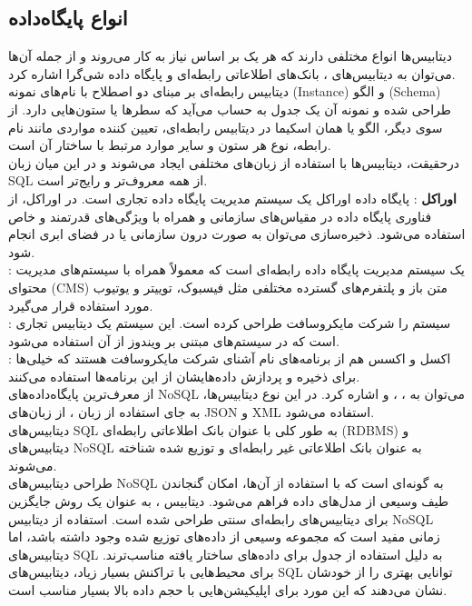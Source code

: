 \documentclass[]{article}
\begin{document}
\subsection*{{\titr انواع پایگاه‌داده}}
دیتابیس‌ها انواع مختلفی دارند که هر یک بر اساس نیاز به کار می‌روند و از جمله آن‌ها می‌توان به دیتابیس‌های ، بانک‌های اطلاعاتی رابطه‌ای و پایگاه داده شی‌گرا اشاره کرد.\\
دیتابیس رابطه‌ای بر مبنای دو اصطلاح با نام‌های نمونه (Instance) و الگو (Schema) طراحی شده و نمونه آن یک جدول به حساب می‌آید که سطرها یا ستون‌هایی دارد. از سوی دیگر، الگو یا همان اسکیما در دیتابیس رابطه‌ای، تعیین کننده مواردی مانند نام رابطه، نوع هر ستون و سایر موارد مرتبط با ساختار آن است.\\
درحقیقت، دیتابیس‌ها با استفاده از زبان‌های مختلفی ایجاد می‌شوند و در این میان زبان SQL  از همه معروف‌تر و رایج‌تر است.\\
\textbf{اوراکل }: پایگاه داده اوراکل یک سیستم مدیریت پایگاه داده تجاری است. در اوراکل، از فناوری پایگاه داده در مقیاس‌های سازمانی و همراه با ویژگی‌های قدرتمند و خاص استفاده می‌شود. ذخیره‌سازی می‌توان به صورت درون سازمانی یا در فضای ابری انجام شود.\\
\textbf{}: یک سیستم مدیریت پایگاه داده رابطه‌ای است که معمولاً همراه با سیستم‌های مدیریت محتوای (CMS) متن باز و پلتفرم‌های گسترده مختلفی مثل فیسبوک، توییتر و یوتیوب مورد استفاده قرار می‌گیرد.\\
\textbf{}: سیستم  را شرکت مایکروسافت طراحی کرده است. این سیستم یک دیتابیس تجاری است که در سیستم‌های مبتنی بر ویندوز از آن استفاده می‌شود.\\
\textbf{}: اکسل و اکسس هم از برنامه‌های نام آشنای شرکت مایکروسافت هستند که خیلی‌ها برای ذخیره و پردازش داده‌هایشان از این برنامه‌ها استفاده می‌کنند.\\
از معرف‌ترین پایگاه‌داده‌های NoSQL می‌توان به ، ،  و  اشاره کرد. در این نوع دیتابیس‌ها، به جای استفاده از زبان ، از زبان‌های JSON و XML استفاده می‌شود.\\
دیتابیس‌های SQL به طور کلی با عنوان بانک اطلاعاتی رابطه‌ای (RDBMS) و دیتابیس‌های NoSQL به عنوان بانک اطلاعاتی غیر رابطه‌ای و توزیع شده شناخته می‌شوند.\\
طراحی دیتابیس‌های NoSQL به گونه‌ای است که با استفاده از آن‌ها، امکان گنجاندن طیف وسیعی از مدل‌های داده فراهم می‌شود. دیتابیس ، به عنوان یک روش جایگزین برای دیتابیس‌های رابطه‌ای سنتی طراحی شده است. استفاده از دیتابیس NoSQL زمانی مفید است که مجموعه وسیعی از داده‌های توزیع شده وجود داشته باشد، اما دیتابیس‌های SQL به دلیل استفاده از جدول برای داده‌های ساختار یافته مناسب‌ترند. برای محیط‌هایی با تراکنش بسیار زیاد، دیتابیس‌های SQL توانایی بهتری را از خودشان نشان می‌دهند که این مورد برای اپلیکیشن‌هایی با حجم داده بالا بسیار مناسب است.
\end{document}
